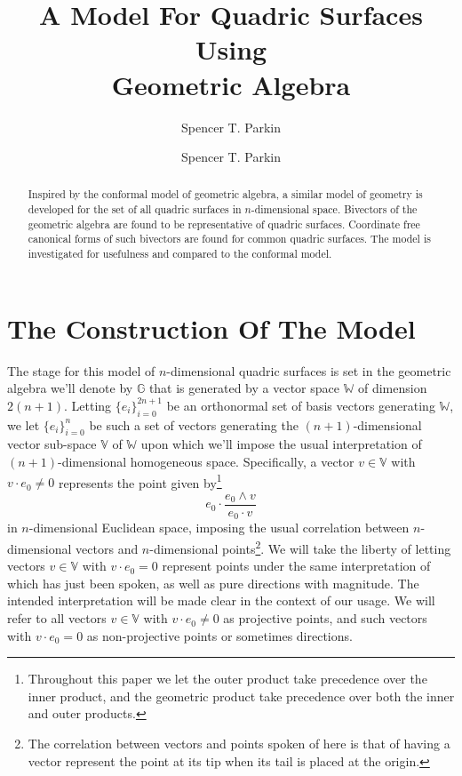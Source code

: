 \documentclass[12pt]{article}
\title{A Model For Quadric Surfaces\\Using\\Geometric Algebra}
\author{Spencer T. Parkin}
\author{Spencer T. Parkin}
\newcommand{\G}{\mathbb{G}}
\newcommand{\V}{\mathbb{V}}
\newcommand{\W}{\mathbb{W}}
\numberwithin{equation}{section}
\begin{document}
\maketitle

\begin{abstract}
Inspired by the conformal model of geometric algebra,
a similar model of geometry is developed for the set
of all quadric surfaces in $n$-dimensional space.  Bivectors of the geometric algebra
are found to be representative of quadric surfaces.  Coordinate free canonical forms
of such bivectors are found for common quadric surfaces.  The model is investigated
for usefulness and compared to the conformal model.
\end{abstract}

\section{The Construction Of The Model}

The stage for this model of $n$-dimensional quadric surfaces is set in the geometric
algebra we'll denote by $\G$ that is generated by a vector space $\W$ of dimension
$2(n+1)$.  Letting $\{e_i\}_{i=0}^{2n+1}$ be an orthonormal set of basis vectors
generating $\W$, we let $\{e_i\}_{i=0}^n$ be such a set of vectors generating
the $(n+1)$-dimensional vector sub-space $\V$ of $\W$ upon which we'll impose the
usual interpretation of $(n+1)$-dimensional homogeneous space.  Specifically,
a vector $v\in\V$ with $v\cdot e_0\neq 0$ represents the point given by\footnote{Throughout this
paper we let the outer product take precedence over the inner product, and the geometric product
take precedence over both the inner and outer products.}
\begin{equation}
e_0\cdot\frac{e_0\wedge v}{e_0\cdot v}
\end{equation}
in $n$-dimensional Euclidean space, imposing the usual correlation between $n$-dimensional
vectors and $n$-dimensional points\footnote{The correlation between
vectors and points spoken of here is that of having a vector represent the point
at its tip when its tail is placed at the origin.}.  We will take the liberty of letting vectors $v\in\V$ with $v\cdot e_0=0$
represent points under the same interpretation of which has just been spoken, as
well as pure directions with magnitude.  The intended interpretation will be made clear
in the context of our usage.  We will refer to all vectors $v\in\V$ with $v\cdot e_0\neq 0$
as projective points, and such vectors with $v\cdot e_0=0$ as non-projective points
or sometimes directions.
\end{document}
